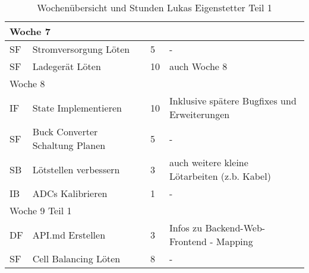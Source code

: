\begin{table}[!hp]
\begin{center}
\begin{tabular}{|p{0.8cm}|p{6cm}|p{0.8cm}|p{8cm}|}
        \multicolumn{4}{|l|}{Woche 7}                                                            \\ \hline
        SF & Stromversorgung Löten                   & 5 & -\\
        SF & Ladegerät Löten                         & 10 & auch Woche 8\\ \hline
        \multicolumn{4}{|l|}{Woche 8}                                                            \\ \hline
        IF & State Implementieren                    & 10& Inklusive spätere Bugfixes und Erweiterungen \\
        SF & Buck Converter Schaltung Planen        & 5 & -\\
        SB & Lötstellen verbessern                   & 3 & auch weitere kleine Lötarbeiten (z.b. Kabel)\\
        IB & ADCs Kalibrieren                        & 1 & - \\ \hline
        \multicolumn{4}{|l|}{Woche 9 Teil 1}                                                \\ \hline
		DF & API.md Erstellen & 3 & Infos zu Backend-Web-Frontend - Mapping\\
        SF & Cell Balancing Löten                    & 8 & -\\  \hline
        \end{tabular}
    \label{tab:overviewLukas1}
    \end{center}
    \caption{Wochenübersicht und Stunden Lukas Eigenstetter Teil 1}
\end{table}

